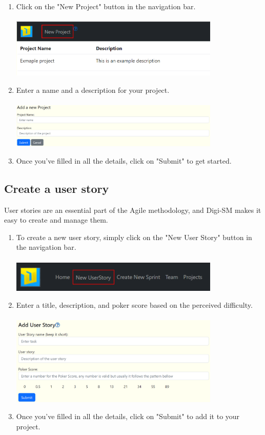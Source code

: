 \documentclass{article}
\begin{document}
\begin{enumerate}
    \item Click on the "New Project" button in the navigation bar.\\\\
    \includegraphics[width=10cm]{newProjectNav.png}
    \item Enter a name and a description for your project.\\\\
    \includegraphics[width=10cm]{createProject.png}
    \item Once you've filled in all the details, click on "Submit" to get started. 
\end{enumerate}

\newpage

\subsection{Create a user story}

User stories are an essential part of the Agile methodology, and Digi-SM makes it easy to create and manage them.\\

\begin{enumerate}
    \item To create a new user story, simply click on the "New User Story" button in the navigation bar.\\\\
    \includegraphics[width=10cm]{userStoryNav.png}
    \item Enter a title, description, and poker score based on the perceived difficulty.\\\\
    \includegraphics[width=10cm]{userStory.png}
    \item  Once you've filled in all the details, click on "Submit" to add it to your project.
\end{enumerate} 
\end{document}
